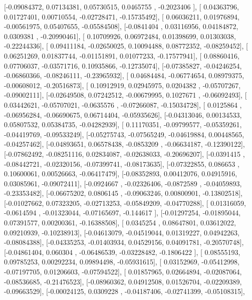 \documentclass{article}
\begin{document}
       [-0.09084372,  0.07134381,  0.05730515,  0.0465755 , -0.2023406 ],
       [ 0.04363796,  0.01727401,  0.00710554, -0.02728471, -0.15735492],
       [ 0.06036211,  0.01976894, -0.00561975,  0.05407655, -0.05584508],
       [-0.0841404 ,  0.03116956,  0.04184872,  0.0309381 , -0.20990461],
       [ 0.10709926,  0.06972484,  0.01398699,  0.01303038, -0.22244336],
       [ 0.09411184, -0.02650025,  0.10094488,  0.08772352, -0.08259452],
       [ 0.06251269,  0.01837744, -0.01151891,  0.01077233, -0.17577941],
       [ 0.08860416,  0.07706037, -0.03571716,  0.10935866, -0.12735074],
       [-0.07385827, -0.04246254, -0.06860366, -0.08246111, -0.23965932],
       [ 0.04684484, -0.06774654,  0.08979375, -0.00608012, -0.20516873],
       [ 0.10912919,  0.02945975,  0.0204382 , -0.05707267, -0.09002111],
       [-0.02649508,  0.07242512, -0.00679995,  0.1027671 , -0.06092493],
       [ 0.03442621, -0.05707021, -0.0635576 , -0.07266087, -0.15034728],
       [ 0.0125864 , -0.06956284, -0.06690675,  0.06714404, -0.05935626],
       [-0.04313046,  0.00134533,  0.05807532,  0.05384735, -0.04282939],
       [ 0.11170351, -0.09799577, -0.05359261, -0.04419769, -0.09533249],
       [-0.05275743, -0.07565249, -0.04619884,  0.00448565, -0.04257462],
       [-0.04893651,  0.06578438, -0.0853209 , -0.06634187, -0.12390122],
       [-0.07862492, -0.08251116,  0.02834087, -0.02638033, -0.20696207],
       [-0.0391415 , -0.08442721, -0.02320156, -0.07399741, -0.08173635],
       [-0.07322855,  0.086653  ,  0.10600061,  0.00526663, -0.06417479],
       [-0.08352893,  0.00412076,  0.04915916,  0.03085961, -0.09072411],
       [-0.0924667 , -0.02326406, -0.0872589 , -0.04059893, -0.23353482],
       [-0.06675202,  0.0806145 , -0.09063246,  0.00800901, -0.13802518],
       [-0.01027662,  0.07323205, -0.02713253, -0.05849209, -0.04770288],
       [ 0.01316059, -0.0614594 , -0.01323044, -0.07165697, -0.144617  ],
       [-0.01297254, -0.01895044,  0.07391577,  0.00200361, -0.16388508],
       [ 0.0345254 ,  0.08647801,  0.03612022,  0.09210939, -0.10238913],
       [-0.04613079, -0.04519044,  0.01319227,  0.04942263, -0.08084388],
       [-0.04335253, -0.01403934,  0.04529156,  0.04091781, -0.20570748],
       [-0.04861404,  0.060304  , -0.06486539, -0.03228482, -0.1806422 ],
       [ 0.08555193,  0.09785253,  0.00292234,  0.09894498, -0.05931615],
       [ 0.03152969, -0.05412998, -0.07197705,  0.01206603, -0.07594522],
       [ 0.01857965,  0.02664894, -0.02087064, -0.08536685, -0.21476523],
       [-0.08960362,  0.04912508,  0.01526704, -0.02209389, -0.09663529],
       [-0.00024125,  0.0309228 , -0.04187406, -0.02741399, -0.05108315],
\end{document}
